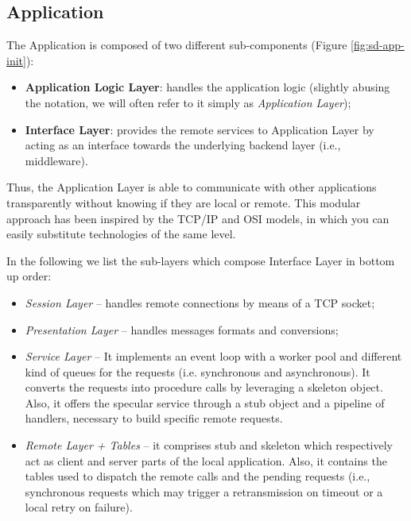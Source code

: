 \subsection{Application}
The Application is composed of two different sub-components (Figure
\ref{fig:sd-app-init}):

\begin{itemize}
  \item \textbf{Application Logic Layer}: handles the application logic
    (slightly abusing the notation, we will often refer to it simply as
    \textit{Application Layer});
  \item \textbf{Interface Layer}: provides the remote services to Application
    Layer by acting as an interface towards the underlying backend layer (i.e.,
    middleware).
\end{itemize}

Thus, the Application Layer is able to communicate with other applications
transparently without knowing if they are local or remote. This modular
approach has been inspired by the TCP/IP and OSI models, in which you can
easily substitute technologies of the same level.

In the following we list the sub-layers which compose Interface Layer in
bottom up order:

\begin{itemize}
  \item \textit{Session Layer} --
  handles remote connections by means of a TCP socket;
  \item \textit{Presentation Layer} --
  handles messages formats and conversions;
  \item \textit{Service Layer} --
  It
  implements an event loop with a worker pool and different kind of queues
  for the requests (i.e. synchronous and asynchronous). It converts the
  requests into procedure calls by leveraging a skeleton object.
  Also, it offers the specular service through a stub object and a pipeline
  of handlers, necessary to build specific remote requests.
  \item \textit{Remote Layer + Tables} --
  it comprises stub and skeleton which respectively act as client and
  server parts of the local application. Also, it contains the tables used
  to dispatch the remote calls and the pending requests (i.e., synchronous
  requests which may trigger a retransmission on timeout or a local retry on
  failure).
\end{itemize}




